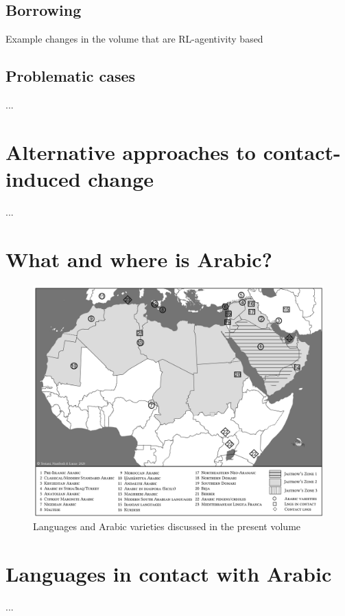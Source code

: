 \documentclass[output=paper]{langsci/langscibook}
\begin{document}
\subsection{Borrowing}
Example changes in the volume that are RL-agentivity based

\subsection{Problematic cases}
...

\section{Alternative approaches to contact-induced change}\label{introotherapproaches} 
...

\section{What and where is Arabic?}

\begin{figure}
\includegraphics[width=\textwidth]{figures/intromap.jpg}
\caption{Languages and Arabic varieties discussed in the present volume}
\label{intromap}
\end{figure}




\section{Languages in contact with Arabic}\label{introcontactlans}
...
\end{document}
